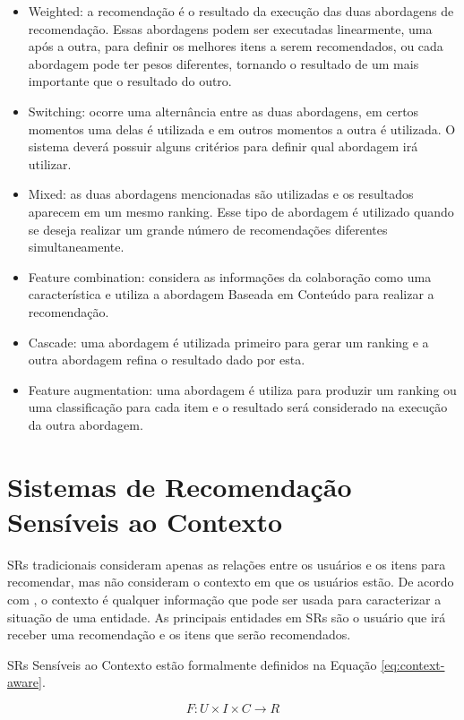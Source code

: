 \begin{itemize}
\item Weighted: a recomendação é o resultado da execução das duas abordagens de recomendação. Essas abordagens podem
ser executadas linearmente, uma após a outra, para definir os melhores itens a serem recomendados, ou cada abordagem
pode ter pesos diferentes, tornando o resultado de um mais importante que o resultado do outro.
\item Switching: ocorre uma alternância entre as duas abordagens, em certos momentos uma delas é utilizada e em outros
momentos a outra é utilizada. O sistema deverá possuir alguns critérios para definir qual abordagem irá utilizar.
\item Mixed: as duas abordagens mencionadas são utilizadas e os resultados aparecem em um mesmo ranking. Esse tipo de
abordagem é utilizado quando se deseja realizar um grande número de recomendações diferentes simultaneamente.
\item Feature combination: considera as informações da colaboração como uma característica e utiliza a abordagem
Baseada em Conteúdo para realizar a recomendação.
\item Cascade: uma abordagem é utilizada primeiro para gerar um ranking e a outra abordagem refina o resultado dado
por esta.
\item Feature augmentation: uma abordagem é utiliza para produzir um ranking ou uma classificação para cada item e o
resultado será considerado na execução da outra abordagem.
\end{itemize}

\section{Sistemas de Recomendação Sensíveis ao Contexto}\label{section:sr-sensivel-contexto}

SRs tradicionais consideram apenas as relações entre os usuários e os itens para recomendar, mas não consideram o
contexto em que os usuários estão. De acordo com , o contexto é qualquer informação
que pode ser usada para caracterizar a situação de uma entidade. As principais entidades em SRs são o usuário que
irá receber uma recomendação e os itens que serão recomendados.

SRs Sensíveis ao Contexto estão formalmente definidos na Equação \ref{eq:context-aware}.

\begin{equation}
  F: U \times I \times C \rightarrow R
  \label{eq:context-aware}
\end{equation}

